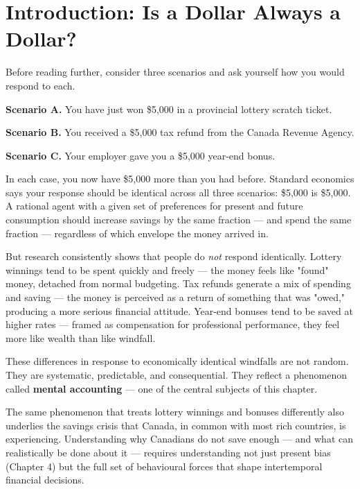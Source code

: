 \documentclass[12pt, letterpaper]{article}
\begin{document}
\medskip


\section*{Introduction: Is a Dollar Always a Dollar?}


Before reading further, consider three scenarios and ask yourself how you would respond to each.

\textbf{Scenario A.} You have just won \$5,000 in a provincial lottery scratch ticket.

\textbf{Scenario B.} You received a \$5,000 tax refund from the Canada Revenue Agency.

\textbf{Scenario C.} Your employer gave you a \$5,000 year-end bonus.

In each case, you now have \$5,000 more than you had before. Standard economics says your response should be identical across all three scenarios: \$5,000 is \$5,000. A rational agent with a given set of preferences for present and future consumption should increase savings by the same fraction --- and spend the same fraction --- regardless of which envelope the money arrived in.

But research consistently shows that people do \textit{not} respond identically. Lottery winnings tend to be spent quickly and freely --- the money feels like "found" money, detached from normal budgeting. Tax refunds generate a mix of spending and saving --- the money is perceived as a return of something that was "owed," producing a more serious financial attitude. Year-end bonuses tend to be saved at higher rates --- framed as compensation for professional performance, they feel more like wealth than like windfall.

These differences in response to economically identical windfalls are not random. They are systematic, predictable, and consequential. They reflect a phenomenon called \textbf{mental accounting} --- one of the central subjects of this chapter.

The same phenomenon that treats lottery winnings and bonuses differently also underlies the savings crisis that Canada, in common with most rich countries, is experiencing. Understanding why Canadians do not save enough --- and what can realistically be done about it --- requires understanding not just present bias (Chapter 4) but the full set of behavioural forces that shape intertemporal financial decisions.
\end{document}
